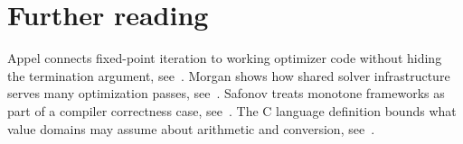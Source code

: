 \section{Further reading}
\label{sec:ch10-reading}

Appel connects fixed-point iteration to working optimizer code without hiding the termination argument, see~\cite{appel-1998-modern}.
Morgan shows how shared solver infrastructure serves many optimization passes, see~\cite{morgan-1998-optimizing}.
Safonov treats monotone frameworks as part of a compiler correctness case, see~\cite{safonov-2010-trustworthy}.
The C language definition bounds what value domains may assume about arithmetic and conversion, see~\cite{wg14-2011-c11}.
